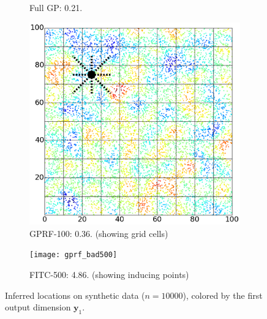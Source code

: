 \documentclass{article}
\renewcommand{\v}[1]{\mathbf{#1}}
\begin{document}
\begin{figure}
\begin{subfigure}[t]{.21\textwidth}
        \caption{Full GP: 0.21.}
        \label{fig:synth_exact} 
    \end{subfigure}\hspace{0.5em}
\begin{subfigure}[t]{.22\textwidth}
        \includegraphics[width=\textwidth]{synth_grid_edges}
        \caption{GPRF-100: 0.36. (showing grid cells)}
        \label{fig:synth_gprf} 
    \end{subfigure}\hspace{0.5em}
\begin{subfigure}[t]{.21\textwidth}
        \centering
        \texttt{[image: gprf\_bad500]}
        \caption{FITC-500: 4.86. (showing inducing points)}
        \label{fig:synth_fitc500} 
\end{subfigure}
\caption{Inferred locations on synthetic data
  ($n=10000$), colored by the first output dimension $\v{y}_1$. }
\label{fig:synth_data}

\end{figure}

\end{document}
